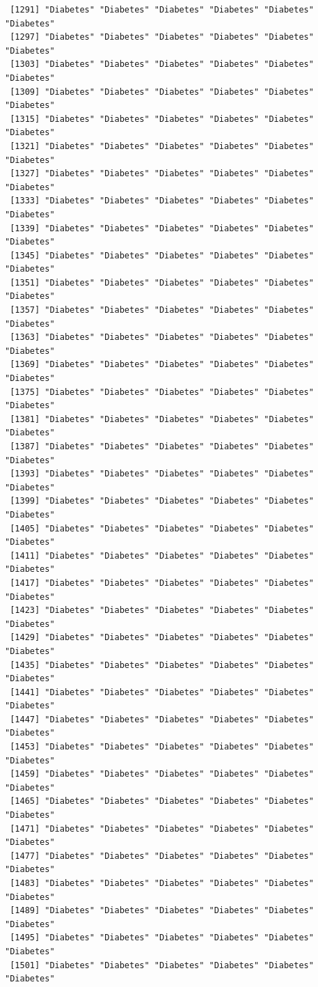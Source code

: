 \documentclass[
  letterpaper,
  DIV=11,
  numbers=noendperiod]{scrartcl}
\begin{document}
\begin{verbatim}
 [1291] "Diabetes" "Diabetes" "Diabetes" "Diabetes" "Diabetes" "Diabetes"
 [1297] "Diabetes" "Diabetes" "Diabetes" "Diabetes" "Diabetes" "Diabetes"
 [1303] "Diabetes" "Diabetes" "Diabetes" "Diabetes" "Diabetes" "Diabetes"
 [1309] "Diabetes" "Diabetes" "Diabetes" "Diabetes" "Diabetes" "Diabetes"
 [1315] "Diabetes" "Diabetes" "Diabetes" "Diabetes" "Diabetes" "Diabetes"
 [1321] "Diabetes" "Diabetes" "Diabetes" "Diabetes" "Diabetes" "Diabetes"
 [1327] "Diabetes" "Diabetes" "Diabetes" "Diabetes" "Diabetes" "Diabetes"
 [1333] "Diabetes" "Diabetes" "Diabetes" "Diabetes" "Diabetes" "Diabetes"
 [1339] "Diabetes" "Diabetes" "Diabetes" "Diabetes" "Diabetes" "Diabetes"
 [1345] "Diabetes" "Diabetes" "Diabetes" "Diabetes" "Diabetes" "Diabetes"
 [1351] "Diabetes" "Diabetes" "Diabetes" "Diabetes" "Diabetes" "Diabetes"
 [1357] "Diabetes" "Diabetes" "Diabetes" "Diabetes" "Diabetes" "Diabetes"
 [1363] "Diabetes" "Diabetes" "Diabetes" "Diabetes" "Diabetes" "Diabetes"
 [1369] "Diabetes" "Diabetes" "Diabetes" "Diabetes" "Diabetes" "Diabetes"
 [1375] "Diabetes" "Diabetes" "Diabetes" "Diabetes" "Diabetes" "Diabetes"
 [1381] "Diabetes" "Diabetes" "Diabetes" "Diabetes" "Diabetes" "Diabetes"
 [1387] "Diabetes" "Diabetes" "Diabetes" "Diabetes" "Diabetes" "Diabetes"
 [1393] "Diabetes" "Diabetes" "Diabetes" "Diabetes" "Diabetes" "Diabetes"
 [1399] "Diabetes" "Diabetes" "Diabetes" "Diabetes" "Diabetes" "Diabetes"
 [1405] "Diabetes" "Diabetes" "Diabetes" "Diabetes" "Diabetes" "Diabetes"
 [1411] "Diabetes" "Diabetes" "Diabetes" "Diabetes" "Diabetes" "Diabetes"
 [1417] "Diabetes" "Diabetes" "Diabetes" "Diabetes" "Diabetes" "Diabetes"
 [1423] "Diabetes" "Diabetes" "Diabetes" "Diabetes" "Diabetes" "Diabetes"
 [1429] "Diabetes" "Diabetes" "Diabetes" "Diabetes" "Diabetes" "Diabetes"
 [1435] "Diabetes" "Diabetes" "Diabetes" "Diabetes" "Diabetes" "Diabetes"
 [1441] "Diabetes" "Diabetes" "Diabetes" "Diabetes" "Diabetes" "Diabetes"
 [1447] "Diabetes" "Diabetes" "Diabetes" "Diabetes" "Diabetes" "Diabetes"
 [1453] "Diabetes" "Diabetes" "Diabetes" "Diabetes" "Diabetes" "Diabetes"
 [1459] "Diabetes" "Diabetes" "Diabetes" "Diabetes" "Diabetes" "Diabetes"
 [1465] "Diabetes" "Diabetes" "Diabetes" "Diabetes" "Diabetes" "Diabetes"
 [1471] "Diabetes" "Diabetes" "Diabetes" "Diabetes" "Diabetes" "Diabetes"
 [1477] "Diabetes" "Diabetes" "Diabetes" "Diabetes" "Diabetes" "Diabetes"
 [1483] "Diabetes" "Diabetes" "Diabetes" "Diabetes" "Diabetes" "Diabetes"
 [1489] "Diabetes" "Diabetes" "Diabetes" "Diabetes" "Diabetes" "Diabetes"
 [1495] "Diabetes" "Diabetes" "Diabetes" "Diabetes" "Diabetes" "Diabetes"
 [1501] "Diabetes" "Diabetes" "Diabetes" "Diabetes" "Diabetes" "Diabetes"

\end{verbatim}
\end{document}
